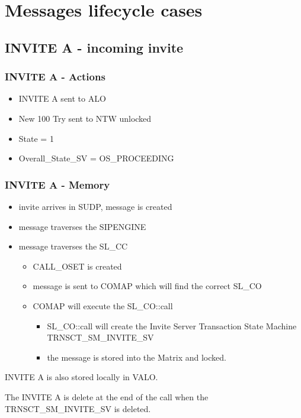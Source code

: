 \documentclass[a4paper]{report}
\begin{document}
\section{Messages lifecycle cases}

\subsection{INVITE A - incoming invite}

\subsubsection{INVITE A - Actions}
\begin {itemize}
\item INVITE A sent to ALO
\item New 100 Try sent to NTW unlocked
\item State = 1
\item Overall\_State\_SV = OS\_PROCEEDING
\end{itemize}

\subsubsection{INVITE A - Memory}

\begin {itemize}
\item invite arrives in SUDP, message is created
\item message traverses the SIPENGINE
\item message traverses the SL\_CC
\begin {itemize}
\item CALL\_OSET is created
\item message is sent to COMAP which will find the correct SL\_CO
\item COMAP will execute the SL\_CO::call
\begin {itemize}
\item SL\_CO::call will create the Invite Server Transaction State Machine TRNSCT\_SM\_INVITE\_SV
\item the message is stored into the Matrix and locked.
\end{itemize}
\end{itemize}
\end{itemize}

INVITE A is also stored locally in VALO.

The INVITE A is delete at the end of the call when the TRNSCT\_SM\_INVITE\_SV is deleted.
\end{document}
